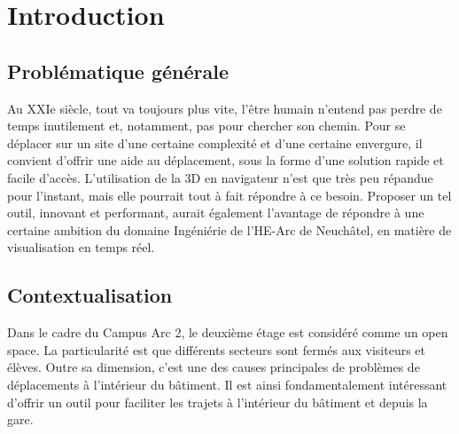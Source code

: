 \chapter{Introduction}

\section{Problématique générale}
Au XXIe siècle, tout va toujours plus vite, l'être humain n'entend pas perdre de temps inutilement et, notamment, pas pour chercher son chemin. Pour se déplacer sur un site d'une certaine complexité et d'une certaine envergure, il convient d'offrir une aide au déplacement, sous la forme d'une solution rapide et facile d'accès. L'utilisation de la 3D en navigateur n'est que très peu répandue pour l'instant, mais elle pourrait tout à fait répondre à ce besoin. Proposer un tel outil, innovant et performant, aurait également l'avantage de répondre à une certaine ambition du domaine Ingéniérie de l'HE-Arc de Neuchâtel, en matière de visualisation en temps réel.   





\section{Contextualisation}
Dans le cadre du Campus Arc 2, le deuxième étage est considéré comme un open space. La particularité est que différents secteurs sont fermés aux visiteurs et élèves. Outre sa dimension, c'est une des causes principales de problèmes de déplacements à l'intérieur du bâtiment. Il est ainsi fondamentalement intéressant d'offrir un outil pour faciliter les trajets à l'intérieur du bâtiment et depuis la gare.